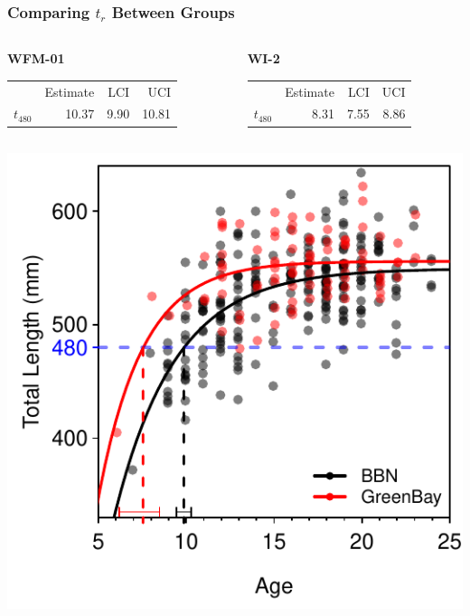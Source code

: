 \documentclass[xcolor=dvipsnames]{beamer}\usepackage[]{graphicx}\usepackage[]{color}
\newenvironment{knitrout}{}{} %
\begin{document}
\begin{frame}[fragile, t]
\frametitle{Comparing $t_{r}$ Between Groups}
\begin{columns}
\begin{column}{0.5\textwidth}
\textbf{WFM-01}
\begin{table}[ht]
\centering
\begin{tabular}{rrrr}
  \hline
 & Estimate & LCI & UCI \\ 
  \rowcolor{light-gray} \hline
$t_{480}$ & 10.37 & 9.90 & 10.81 \\ 
   \hline
\end{tabular}
\end{table}

\end{column}
\begin{column}{0.5\textwidth}
\textbf{WI-2}
\begin{table}[ht]
\centering
\begin{tabular}{rrrr}
  \hline
 & Estimate & LCI & UCI \\ 
  \rowcolor{light-gray} \hline
$t_{480}$ & 8.31 & 7.55 & 8.86 \\ 
   \hline
\end{tabular}
\end{table}

\end{column}
\end{columns}

\begin{knitrout}\footnotesize
{}\color{fgcolor}

{\centering \includegraphics[width=.45\linewidth]{Figs/unnamed-chunk-17-1} 

}



\end{knitrout}
\end{frame}
\end{document}
